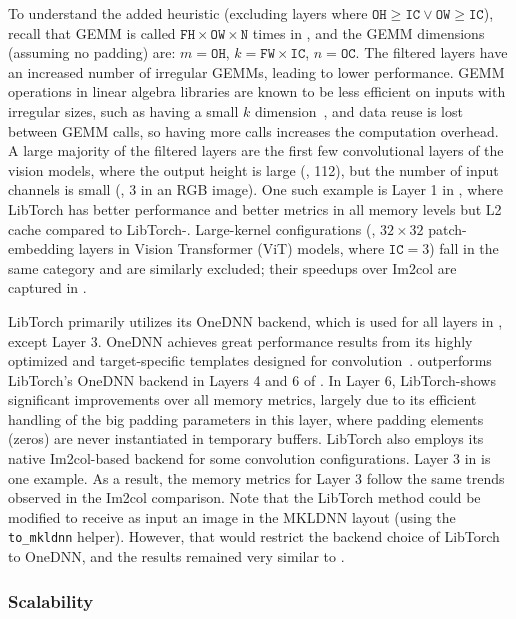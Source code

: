 To understand the added heuristic (excluding layers where $\texttt{OH} \geq \texttt{IC} \lor \texttt{OW} \geq \texttt{IC}$), recall that GEMM is called $\texttt{FH}\times\texttt{OW}\times\texttt{N}$ times in \algname, and the GEMM dimensions (assuming no padding) are: $m = \texttt{OH}$, $k = \texttt{FW}\times\texttt{IC}$, $n = \texttt{OC}$.
The filtered layers have an increased number of irregular GEMMs, leading to lower performance.
GEMM operations in linear algebra libraries are known to be less efficient on inputs with irregular sizes, such as having a small $k$ dimension~\cite{libshalom2021}, and data reuse is lost between GEMM calls, so having more calls increases the computation overhead.
A large majority of the filtered layers are the first few convolutional layers of the vision models, where the output height is large (\eg, 112), but the number of input channels is small (\eg, 3 in an RGB image).
One such example is Layer 1 in , where LibTorch has better performance and better metrics in all memory levels but L2 cache compared to LibTorch-\algname.
Large-kernel configurations (\eg, $32\times32$ patch-embedding layers in Vision Transformer (ViT) models, where $\texttt{IC}=3$) fall in the same category and are similarly excluded; their speedups over Im2col are captured in .

LibTorch primarily utilizes its OneDNN backend, which is used for all layers in , except Layer 3.
OneDNN achieves great performance results from its highly optimized and target-specific templates designed for convolution~\cite{onednn,libxsmm2016}.
\algname outperforms LibTorch's OneDNN backend in Layers 4 and 6 of .
In Layer 6, LibTorch-\algname shows significant improvements over all memory metrics, largely due to its efficient handling of the big padding parameters in this layer, where padding elements (zeros) are never instantiated in temporary buffers.
LibTorch also employs its native Im2col-based backend for some convolution configurations.
Layer 3 in  is one example.
As a result, the memory metrics for Layer 3 follow the same trends observed in the Im2col comparison.
Note that the LibTorch method could be modified to receive as input an image in the MKLDNN layout (using the \texttt{to\_mkldnn} helper).
However, that would restrict the backend choice of LibTorch to OneDNN, and the results remained very similar to .

\subsubsection{Scalability}
\label{sec:scalability}


